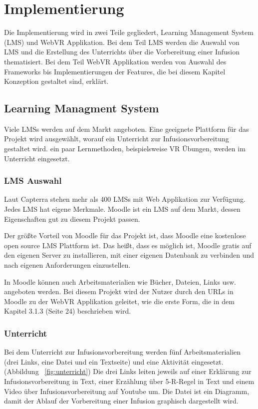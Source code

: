 \chapter{Implementierung}

Die Implementierung wird in zwei Teile gegliedert, Learning Management System (LMS) und WebVR Applikation. Bei dem Teil LMS werden die Auswahl von LMS und die Erstellung des Unterrichts über die Vorbereitung einer Infusion thematisiert. Bei dem Teil WebVR Applikation werden von Auswahl des Frameworks bis Implementierungen der Features, die bei diesem Kapitel Konzeption gestaltet sind, erklärt.

\section{Learning Managment System}

Viele LMSs werden auf dem Markt angeboten. Eine geeignete Plattform für das Projekt wird ausgewählt, worauf ein Unterricht zur Infusionsvorbereitung gestaltet wird. ein paar Lernmethoden, beispielsweise VR Übungen, werden im Unterricht eingesetzt.

 \subsection{LMS Auswahl}

 Laut Capterra stehen mehr als 400 LMSs mit Web Applikation zur Verfügung. Jedes LMS hat eigene Merkmale. Moodle ist ein LMS auf dem Markt, dessen Eigenschaften gut zu diesem Projekt passen.
 
 Der größte Vorteil von Moodle für das Projekt ist, dass Moodle eine kostenlose open source LMS Plattform ist. Das heißt, dass es möglich ist, Moodle gratis auf den eigenen Server zu installieren, mit einer eigenen Datenbank zu verbinden und nach eigenen Anforderungen einzustellen.
 
 In Moodle können auch Arbeitsmaterialien wie Bücher, Dateien, Links usw. angeboten werden. Bei diesem Projekt wird der Nutzer durch den URLs in Moodle zu der WebVR Applikation geleitet, wie die erste Form, die in dem Kapitel 3.1.3 (Seite 24) beschrieben wird. 
 
 \subsection{Unterricht}
 Bei dem Unterricht zur Infusionsvorbereitung werden fünf Arbeitsmaterialien (drei Links, eine Datei und ein Textseite) und eine Aktivität eingesetzt.(Abbildung ~\ref{fig:unterricht}) Die drei Links leiten jeweils auf einer Erklärung zur Infusionsvorbereitung in Text, einer Erzählung über 5-R-Regel in Text und einem Video über Infusionsvorbereitung auf Youtube um. Die Datei ist ein Diagramm, damit der Ablauf der Vorbereitung einer Infusion graphisch dargestellt wird.
 
